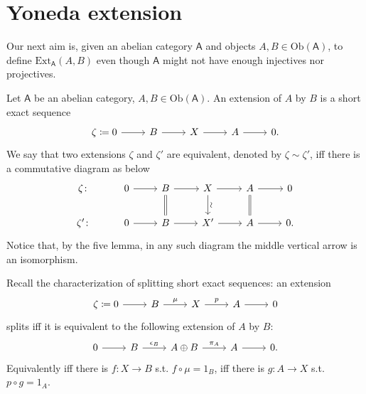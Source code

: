 \section{Yoneda extension}
Our next aim is, given an abelian category $\mathsf{A}$
and objects $A,B \in \mathrm{Ob} \left(\mathsf{A}\right)$,
to define $\mathrm{Ext}^{ }_{ \mathsf{A}} \left( A, B \right)$ even though
$\mathsf{A}$ might not have enough injectives nor projectives.

\begin{defn}[Extension]
	Let $\mathsf{A}$ be an abelian category, $A,B \in \mathrm{Ob} \left(\mathsf{A}\right)$.
	An extension of $A$ by $B$ is a short exact sequence
	\begin{equation*}
	\begin{tikzcd}
		\zeta \coloneqq 0 \arrow[r, "", rightarrow] &
		B \arrow[r, "", rightarrow] &
		X \arrow[r, "", rightarrow] &
		A \arrow[r, "", rightarrow] &
		0
	.\end{tikzcd}
	\end{equation*}
	We say that two extensions $\zeta$ and $\zeta'$ are equivalent, denoted by $\zeta \sim \zeta'$,
	iff there is a commutative diagram as below
	\begin{equation}
	\begin{tikzcd}
		\zeta \colon &
		0 \arrow[r, "", rightarrow] &
		B \arrow[r, "", rightarrow] \arrow[d, "", equal] &
		X \arrow[r, "", rightarrow] \arrow[d, "\rotatebox{90}{\(\sim\)}", rightarrow] &
		A \arrow[r, "", rightarrow] \arrow[d, "", equal] &
		0\\
		\zeta' \colon &
		0 \arrow[r, "", rightarrow] &
		B \arrow[r, "", rightarrow] &
		X' \arrow[r, "", rightarrow] &
		A \arrow[r, "", rightarrow] &
		0.
	\end{tikzcd}
	\end{equation} 
	Notice that, by the five lemma, in any such diagram the middle
	vertical arrow is an isomorphism.
\end{defn}

\begin{rem}
	Recall the characterization of splitting short exact sequences: an extension
	\begin{equation*}
	\begin{tikzcd}
		\zeta \coloneqq 0 \arrow[r, "", rightarrow] &
		B \arrow[r, "\mu", rightarrow] &
		X \arrow[r, "p", rightarrow] &
		A \arrow[r, "", rightarrow] &
		0
	\end{tikzcd}
	\end{equation*}
	splits iff it is equivalent to the following extension of $A$ by $B$:
	\begin{equation*}
	\begin{tikzcd}
		0 \arrow[r, "", rightarrow] &
		B \arrow[r, "\epsilon_B", rightarrow] &
		A \oplus B \arrow[r, "\pi_A", rightarrow] &
		A \arrow[r, "", rightarrow] &
		0
	.\end{tikzcd}
	\end{equation*}
	Equivalently iff there is $f\colon X \to B$ s.t. $f \circ \mu = 1_B$,
	iff there is $g\colon A \to X$ s.t. $p \circ g = 1_A$.
\end{rem}

